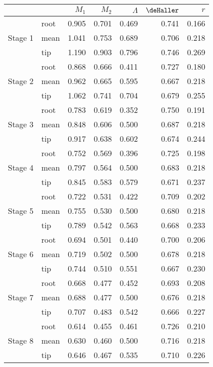 \begin{center}
\begin{tabular}{llrrrrr}
\toprule
 &  & $M_{1}$ & $M_{2}$ & $\Lambda$ & $\deHaller$ & $r$ \\
\midrule
\multirow[t]{3}{*}{Stage 1} & root & 0.905 & 0.701 & 0.469 & 0.741 & 0.166 \\
 & mean & 1.041 & 0.753 & 0.689 & 0.706 & 0.218 \\
 & tip & 1.190 & 0.903 & 0.796 & 0.746 & 0.269 \\
\cline{1-7}
\multirow[t]{3}{*}{Stage 2} & root & 0.868 & 0.666 & 0.411 & 0.727 & 0.180 \\
 & mean & 0.962 & 0.665 & 0.595 & 0.667 & 0.218 \\
 & tip & 1.062 & 0.741 & 0.704 & 0.679 & 0.255 \\
\cline{1-7}
\multirow[t]{3}{*}{Stage 3} & root & 0.783 & 0.619 & 0.352 & 0.750 & 0.191 \\
 & mean & 0.848 & 0.606 & 0.500 & 0.687 & 0.218 \\
 & tip & 0.917 & 0.638 & 0.602 & 0.674 & 0.244 \\
\cline{1-7}
\multirow[t]{3}{*}{Stage 4} & root & 0.752 & 0.569 & 0.396 & 0.725 & 0.198 \\
 & mean & 0.797 & 0.564 & 0.500 & 0.683 & 0.218 \\
 & tip & 0.845 & 0.583 & 0.579 & 0.671 & 0.237 \\
\cline{1-7}
\multirow[t]{3}{*}{Stage 5} & root & 0.722 & 0.531 & 0.422 & 0.709 & 0.202 \\
 & mean & 0.755 & 0.530 & 0.500 & 0.680 & 0.218 \\
 & tip & 0.789 & 0.542 & 0.563 & 0.668 & 0.233 \\
\cline{1-7}
\multirow[t]{3}{*}{Stage 6} & root & 0.694 & 0.501 & 0.440 & 0.700 & 0.206 \\
 & mean & 0.719 & 0.502 & 0.500 & 0.678 & 0.218 \\
 & tip & 0.744 & 0.510 & 0.551 & 0.667 & 0.230 \\
\cline{1-7}
\multirow[t]{3}{*}{Stage 7} & root & 0.668 & 0.477 & 0.452 & 0.693 & 0.208 \\
 & mean & 0.688 & 0.477 & 0.500 & 0.676 & 0.218 \\
 & tip & 0.707 & 0.483 & 0.542 & 0.666 & 0.227 \\
\cline{1-7}
\multirow[t]{3}{*}{Stage 8} & root & 0.614 & 0.455 & 0.461 & 0.726 & 0.210 \\
 & mean & 0.630 & 0.460 & 0.500 & 0.716 & 0.218 \\
 & tip & 0.646 & 0.467 & 0.535 & 0.710 & 0.226 \\
\cline{1-7}
\bottomrule
\end{tabular}
\end{center}

